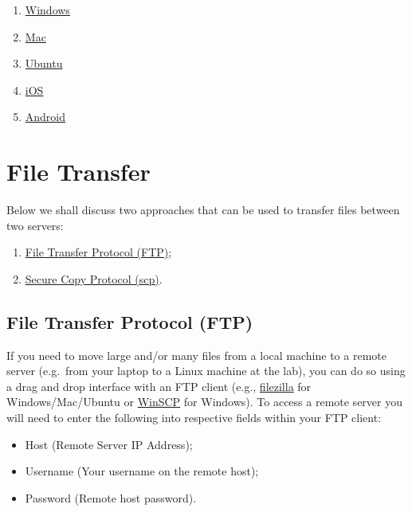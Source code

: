 \documentclass[
]{book}
\providecommand{\tightlist}{%
  \setlength{\itemsep}{0pt}\setlength{\parskip}{0pt}}
\begin{document}
\begin{enumerate}
\def\labelenumi{\arabic{enumi})}
\tightlist
\item
  \href{https://www.liverpool.ac.uk/csd/security/information-security/encryption/}{Windows}
\item
  \href{https://support.apple.com/en-gb/guide/disk-utility/dskutl35612/mac}{Mac}
\item
  \href{https://help.ubuntu.com/community/Full_Disk_Encryption_Howto_2019}{Ubuntu}
\item
  \href{https://support.apple.com/en-gb/guide/security/secf6276da8a/1/web/1}{iOS}
\item
  \href{https://www.howtogeek.com/141953/how-to-encrypt-your-android-phone-and-why-you-might-want-to/}{Android}
\end{enumerate}

\hypertarget{file-transfer}{%
\section{File Transfer}\label{file-transfer}}

Below we shall discuss two approaches that can be used to transfer files between
two servers:

\begin{enumerate}
\def\labelenumi{\arabic{enumi})}
\tightlist
\item
  \href{https://en.wikipedia.org/wiki/File_Transfer_Protocol}{File Transfer Protocol (FTP)};
\item
  \href{https://en.wikipedia.org/wiki/Secure_copy}{Secure Copy Protocol (scp)}.
\end{enumerate}

\hypertarget{file-transfer-protocol-ftp}{%
\subsection{File Transfer Protocol (FTP)}\label{file-transfer-protocol-ftp}}

If you need to move large and/or many files from a local machine to a remote
server (e.g.~from your laptop to a Linux machine at the lab), you can do so
using a drag and drop interface with an FTP client (e.g., \href{https://filezilla-project.org/}{filezilla}
for Windows/Mac/Ubuntu or \href{https://winscp.net/eng/index.php}{WinSCP} for Windows). To access
a remote server you will need to enter the following into respective fields within your FTP client:

\begin{itemize}
\tightlist
\item
  Host (Remote Server IP Address);
\item
  Username (Your username on the remote host);
\item
  Password (Remote host password).
\end{itemize}
\end{document}
